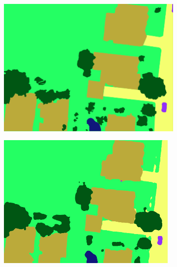 \begin{figure}[h!]
\begin{subfigure}[b]{0.45\textwidth}
         \includegraphics[width=\textwidth]{img/2_1.png}
         \caption{}
         \label{}
     \end{subfigure}
     \hfill
     \begin{subfigure}[b]{0.45\textwidth}
         \centering
         \includegraphics[width=\textwidth]{img/2_2.png}
         \caption{}
         \label{}
     \end{subfigure}
     \hfill
     \begin{subfigure}[b]{0.45\textwidth}
         \centering

\end{subfigure}
\end{figure}

